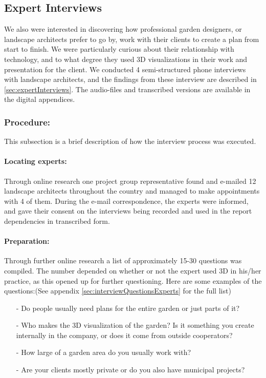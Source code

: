 \subsection{Expert Interviews}
We also were interested in discovering how professional garden designers, or landscape architects prefer to go by, work with their clients to create a plan from start to finish. We were particularly curious about their relationship with technology, and to what degree they used 3D visualizations in their work and presentation for the client. We conducted 4 semi-structured phone interviews with landscape architects, and the findings from these interview are described in \autoref{sec:expertInterviews}. The audio-files and transcribed versions are available in the digital appendices. 

\subsubsection{Procedure:}
This subsection is a brief description of how the interview process was executed.

\paragraph*{Locating experts:}
Through online research one project group representative found and e-mailed 12 landscape architects throughout the country and managed to make appointments with 4 of them. During the e-mail correspondence, the experts were informed, and gave their consent on the interviews being recorded and used in the report dependencies in transcribed form.

\paragraph*{Preparation:}
Through further online research a list of approximately 15-30 questions was compiled. The number depended on whether or not the expert used 3D in his/her practice, as this opened up for further questioning. Here are some examples of the questions:(See appendix \ref{sec:interviewQuestionsExperts} for the full list)

\begin{itemize}
	\item[-] Do people usually need plans for the entire garden or just parts of it?
	\item[-] Who makes the 3D visualization of the garden? Is it something you create internally in the company, or does it come from outside cooperators? 
	\item[-] How large of a garden area do you usually work with?
	\item[-] Are your clients mostly private or do you also have municipal projects?
\end{itemize}

